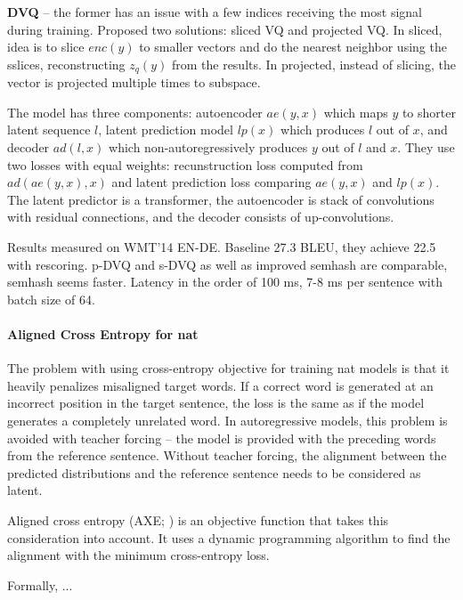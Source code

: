 \textbf{DVQ} -- the former has an issue with a few indices receiving the most signal
during training. Proposed two solutions: sliced VQ and projected VQ. In sliced,
idea is to slice $enc(y)$ to smaller vectors and do the nearest neighbor using
the sslices, reconstructing $z_q(y)$ from the results. In projected, instead of
slicing, the vector is projected multiple times to subspace.

The model has three components: autoencoder $ae(y, x)$ which maps $y$ to shorter
latent sequence $l$, latent prediction model $lp(x)$ which produces $l$ out of
$x$, and decoder $ad(l, x)$ which non-autoregressively produces $y$ out of $l$
and $x$. They use two losses with equal weights: recunstruction loss computed
from $ad(ae(y,x),x)$ and latent prediction loss comparing $ae(y,x)$ and $lp(x)$.
The latent predictor is a transformer, the autoencoder is stack of convolutions
with residual connections, and the decoder consists of up-convolutions.

Results measured on WMT'14 EN-DE. Baseline 27.3 BLEU, they achieve 22.5 with
rescoring. p-DVQ and s-DVQ as well as improved semhash are comparable, semhash
seems faster. Latency in the order of 100 ms, 7-8 ms per sentence with batch
size of 64.


\paragraph{Aligned Cross Entropy for \gls{nat}} The problem with using
cross-entropy objective for training \gls{nat} models is that it heavily
penalizes misaligned target words. If a correct word is generated at an
incorrect position in the target sentence, the loss is the same as if the model
generates a completely unrelated word. In autoregressive models, this problem
is avoided with teacher forcing -- the model is provided with the preceding
words from the reference sentence. Without teacher forcing, the alignment
between the predicted distributions and the reference sentence needs to be
considered as latent.

Aligned cross entropy (AXE; \citealp{ghazvininejad2020aligned}) is an objective
function that takes this consideration into account. It uses a dynamic
programming algorithm to find the alignment with the minimum cross-entropy
loss.

Formally, ... 


